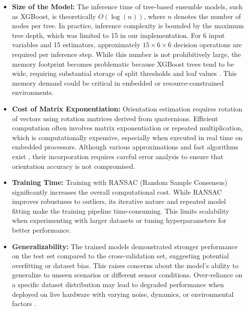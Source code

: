\documentclass{iutbscthesis}
\begin{document}
\begin{itemize}
    \item \textbf{Size of the Model:} The inference time of tree-based ensemble models, such as XGBoost, is theoretically $O(\log(n))$, where $n$ denotes the number of nodes per tree. In practice, inference complexity is bounded by the maximum tree depth, which was limited to 15 in our implementation. For 6 input variables and 15 estimators, approximately $15 \times 6 \times 6$ decision operations are required per inference step. While this number is not prohibitively large, the memory footprint becomes problematic because XGBoost trees tend to be wide, requiring substantial storage of split thresholds and leaf values \cite{chen2016xgboost}. This memory demand could be critical in embedded or resource-constrained environments.
    
    \item \textbf{Cost of Matrix Exponentiation:} Orientation estimation requires rotation of vectors using rotation matrices derived from quaternions. Efficient computation often involves matrix exponentiation or repeated multiplication, which is computationally expensive, especially when executed in real time on embedded processors. Although various approximations and fast algorithms exist \cite{gallego2015compact}, their incorporation requires careful error analysis to ensure that orientation accuracy is not compromised.
    
    \item \textbf{Training Time:} Training with RANSAC (Random Sample Consensus) significantly increases the overall computational cost. While RANSAC improves robustness to outliers, its iterative nature and repeated model fitting make the training pipeline time-consuming. This limits scalability when experimenting with larger datasets or tuning hyperparameters for better performance.
    
    \item \textbf{Generalizability:} The trained models demonstrated stronger performance on the test set compared to the cross-validation set, suggesting potential overfitting or dataset bias. This raises concerns about the model’s ability to generalize to unseen scenarios or different sensor conditions. Over-reliance on a specific dataset distribution may lead to degraded performance when deployed on live hardware with varying noise, dynamics, or environmental factors \cite{goodfellow2016deep}.
\end{itemize}
\end{document}
